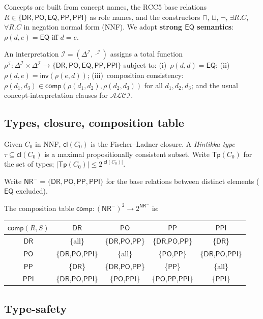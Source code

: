 \documentclass[a4paper,11pt]{article}
\theoremstyle{definition}
\newcommand{\ALCI}{\ensuremath{\mathcal{ALCI}}}
\newcommand{\DR}{\ensuremath{\mathsf{DR}}}
\newcommand{\PO}{\ensuremath{\mathsf{PO}}}
\newcommand{\EQ}{\ensuremath{\mathsf{EQ}}}
\newcommand{\PP}{\ensuremath{\mathsf{PP}}}
\newcommand{\PPI}{\ensuremath{\mathsf{PPI}}}
\newcommand{\inv}{\ensuremath{\mathsf{inv}}}
\newcommand{\comp}{\ensuremath{\mathsf{comp}}}
\newcommand{\cl}{\ensuremath{\mathsf{cl}}}
\newcommand{\Tp}{\ensuremath{\mathsf{Tp}}}
\newcommand{\NR}{\ensuremath{\mathsf{NR}}}
\newcommand{\interp}{\ensuremath{\mathcal{I}}}
\newcommand{\DeltaI}{\ensuremath{\Delta^{\mathcal{I}}}}
\begin{document}
Concepts are built from concept names, the RCC5 base relations
$R \in \{\DR, \PO, \EQ, \PP, \PPI\}$ as role names, and the
constructors $\sqcap$, $\sqcup$, $\neg$, $\exists R.C$,
$\forall R.C$ in negation normal form (NNF).  We adopt
\textbf{strong $\EQ$ semantics}: $\rho(d, e) = \EQ$ iff
$d = e$.

An interpretation $\interp = (\DeltaI, \cdot^{\interp})$
assigns a total function
$\rho^{\interp}: \DeltaI \times \DeltaI \to
\{\DR, \PO, \EQ, \PP, \PPI\}$ subject to: (i)~$\rho(d,d) = \EQ$;
(ii)~$\rho(d,e) = \inv(\rho(e,d))$;
(iii)~composition consistency:
$\rho(d_1, d_3) \in \comp(\rho(d_1, d_2), \rho(d_2, d_3))$
for all $d_1, d_2, d_3$; and the usual concept-interpretation
clauses for $\ALCI$.

\subsection{Types, closure, composition table}

Given $C_0$ in NNF, $\cl(C_0)$ is the Fischer--Ladner closure.
A \emph{Hintikka type} $\tau \subseteq \cl(C_0)$ is a maximal
propositionally consistent subset.  Write $\Tp(C_0)$ for the
set of types; $|\Tp(C_0)| \le 2^{|\cl(C_0)|}$.

Write $\NR^{-} = \{\DR, \PO, \PP, \PPI\}$ for the base
relations between distinct elements ($\EQ$ excluded).

The composition table
$\comp: (\NR^{-})^2 \to 2^{\NR^{-}}$ is:

\begin{center}
\renewcommand{\arraystretch}{1.15}
\begin{tabular}{c|cccc}
$\comp(R, S)$ & $\DR$ & $\PO$ & $\PP$ & $\PPI$ \\
\hline
$\DR$ & \{all\} & \{$\DR$,$\PO$,$\PP$\} &
  \{$\DR$,$\PO$,$\PP$\} & \{$\DR$\} \\
$\PO$ & \{$\DR$,$\PO$,$\PPI$\} & \{all\} &
  \{$\PO$,$\PP$\} & \{$\DR$,$\PO$,$\PPI$\} \\
$\PP$ & \{$\DR$\} & \{$\DR$,$\PO$,$\PP$\} &
  \{$\PP$\} & \{all\} \\
$\PPI$ & \{$\DR$,$\PO$,$\PPI$\} & \{$\PO$,$\PPI$\} &
  \{$\PO$,$\PP$,$\PPI$\} & \{$\PPI$\} \\
\end{tabular}
\end{center}

\subsection{Type-safety}
\end{document}
